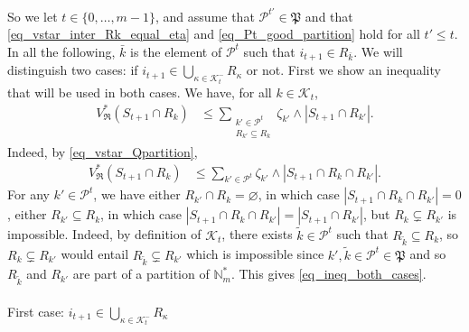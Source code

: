 \documentclass[
  11pt,
  a4paper,
]{article}
\makeatletter
\let\oldparagraph\paragraph
\renewcommand{\paragraph}{
    \@ifstar
      \xxxParagraphStar
      \xxxParagraphNoStar
  }
\newcommand{\xxxParagraphStar}[1]{\oldparagraph*{#1}\mbox{}}
\newcommand{\xxxParagraphNoStar}[1]{\oldparagraph{#1}\mbox{}}
\theoremstyle{plain}
\theoremstyle{definition}
\theoremstyle{plain}
\theoremstyle{definition}
\theoremstyle{plain}
\theoremstyle{remark}
\makeatother
\begin{document}
So we let \(t\in\{ 0,\dotsc,m-1\}\), and assume that
\(\mathcal{P}^{t'}\in\mathfrak P\) and that
\eqref{eq_vstar_inter_Rk_equal_eta} and \eqref{eq_Pt_good_partition}
hold for all \(t'\leq t\). In all the following, \(\bar k\) is the
element of \(\mathcal{P}^t\) such that \(i_{t+1}\in R_{\bar k}\). We
will distinguish two cases: if
\(i_{t+1}\in\bigcup_{\kappa\in\mathcal{K}^-_{t}}R_{\kappa}\) or not.
First we show an inequality that will be used in both cases. We have,
for all \(k\in\mathcal{K}_t\), \begin{align}
V^*_{\mathfrak{R}}(S_{t+1}\cap R_k)&\leq \sum_{\substack{k'\in\mathcal{P}^{t}\\R_{k'}\subseteq R_k}} \zeta_{k'}\wedge |S_{t+1}\cap R_{k'}|.\label{eq_ineq_both_cases}
\end{align} Indeed, by \eqref{eq_vstar_Qpartition}, \begin{align*}
V^*_{\mathfrak{R}}(S_{t+1}\cap R_k)&\leq  \sum_{k'\in\mathcal{P}^{t}} \zeta_{k'}\wedge |S_{t+1}\cap R_k \cap R_{k'}|.
\end{align*} For any \(k'\in\mathcal{P}^{t}\), we have either
\(R_{k'}\cap R_k=\varnothing\), in which case
\(|S_{t+1}\cap R_k \cap R_{k'}|=0\), either \(R_{k'}\subseteq R_k\), in
which case \(|S_{t+1}\cap R_k \cap R_{k'}|=|S_{t+1} \cap R_{k'}|\), but
\(R_{k}\subsetneq R_{k'}\) is impossible. Indeed, by definition of
\(\mathcal{K}_t\), there exists \(\tilde k\in \mathcal{P}^t\) such that
\(R_{\tilde k}\subseteq R_k\), so \(R_{k}\subsetneq R_{k'}\) would
entail \(R_{\tilde k}\subsetneq R_{k'}\) which is impossible since
\(k', \tilde k\in \mathcal{P}^t\in\mathfrak P\) and so \(R_{\tilde k}\)
and \(R_{k'}\) are part of a partition of \(\mathbb{N}_m^*\). This gives
\eqref{eq_ineq_both_cases}.

\paragraph{\texorpdfstring{First case:
\(i_{t+1}\in\bigcup_{\kappa\in\mathcal{K}^-_{t}}R_{\kappa}\)}{First case: i\_\{t+1\}\textbackslash in\textbackslash bigcup\_\{\textbackslash kappa\textbackslash in\textbackslash mathcal\{K\}\^{}-\_\{t\}\}R\_\{\textbackslash kappa\}}}\label{first-case-i_t1inbigcup_kappainmathcalk-_tr_kappa}
\end{document}
